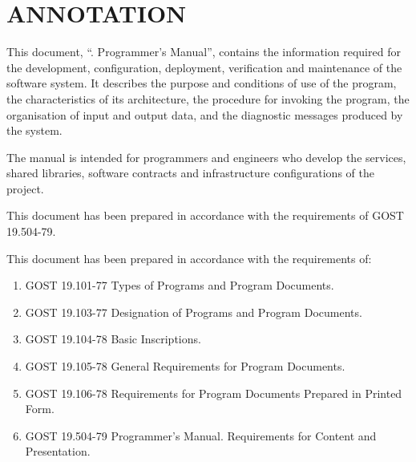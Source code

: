 \documentclass[12pt,a4paper]{extarticle}
\begin{document}
\sloppy



\section*{ANNOTATION}

This document, \enquote{\hseProjectName. Programmer's Manual}, contains the information required for the development, configuration, deployment, verification and maintenance of the software system. It describes the purpose and conditions of use of the program, the characteristics of its architecture, the procedure for invoking the program, the organisation of input and output data, and the diagnostic messages produced by the system.

The manual is intended for programmers and engineers who develop the services, shared libraries, software contracts and infrastructure configurations of the project.

This document has been prepared in accordance with the requirements of GOST 19.504-79\cite{gost19504}.

\clearpage

\noindent
This document has been prepared in accordance with the requirements of:

\begin{enumerate}[label=\arabic*), leftmargin=1.25cm]
  \item GOST 19.101-77 Types of Programs and Program Documents\cite{gost19101}.
  \item GOST 19.103-77 Designation of Programs and Program Documents\cite{gost19103}.
  \item GOST 19.104-78 Basic Inscriptions\cite{gost19104}.
  \item GOST 19.105-78 General Requirements for Program Documents\cite{gost19105}.
  \item GOST 19.106-78 Requirements for Program Documents Prepared in Printed
        Form\cite{gost19106}.
  \item GOST 19.504-79 Programmer's Manual. Requirements for Content and
        Presentation\cite{gost19504}.
\end{enumerate}
\end{document}

